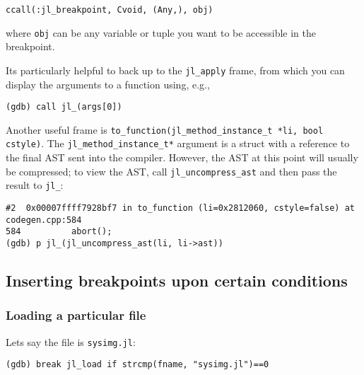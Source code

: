 \begin{verbatim}
ccall(:jl_breakpoint, Cvoid, (Any,), obj)
\end{verbatim}



where \texttt{obj} can be any variable or tuple you want to be accessible in the breakpoint.



It{\textquotesingle}s particularly helpful to back up to the \texttt{jl\_apply} frame, from which you can display the arguments to a function using, e.g.,




\begin{lstlisting}
(gdb) call jl_(args[0])
\end{lstlisting}



Another useful frame is \texttt{to\_function(jl\_method\_instance\_t *li, bool cstyle)}. The \texttt{jl\_method\_instance\_t*} argument is a struct with a reference to the final AST sent into the compiler. However, the AST at this point will usually be compressed; to view the AST, call \texttt{jl\_uncompress\_ast} and then pass the result to \texttt{jl\_}:




\begin{lstlisting}
#2  0x00007ffff7928bf7 in to_function (li=0x2812060, cstyle=false) at codegen.cpp:584
584          abort();
(gdb) p jl_(jl_uncompress_ast(li, li->ast))
\end{lstlisting}



\hypertarget{10952602490249170772}{}


\subsection{Inserting breakpoints upon certain conditions}



\hypertarget{796097711199942153}{}


\subsubsection{Loading a particular file}



Let{\textquotesingle}s say the file is \texttt{sysimg.jl}:




\begin{lstlisting}
(gdb) break jl_load if strcmp(fname, "sysimg.jl")==0
\end{lstlisting}



